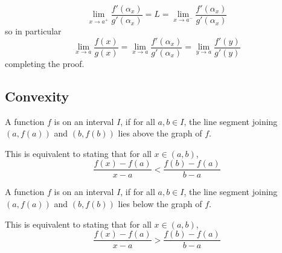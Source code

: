 \documentclass[12pt]{report}
\begin{document}
\begin{proof*}{}{}
\begin{equation*}
        \lim\limits_{x\rightarrow a^+} \frac{f'(\alpha_x)}{g'(\alpha_x)} = L = \lim\limits_{x\rightarrow a^-} \frac{f'(\alpha_x)}{g'(\alpha_x)} 
    \end{equation*}
    so in particular \begin{equation*}
        \lim\limits_{x\rightarrow a} \frac{f(x)}{g(x)} = \lim\limits_{x\rightarrow a} \frac{f'(\alpha_x)}{g'(\alpha_x)} =  \lim\limits_{y\rightarrow a} \frac{f'(y)}{g'(y)}
    \end{equation*}
    completing the proof.
\end{proof*}


\subsection{Convexity}


\begin{defn}{}{}
    A function $f$ is  on an interval $I$, if for all $a,b \in I$, the line segment joining $(a,f(a))$ and $(b,f(b))$ lies above the graph of $f$.

    This is equivalent to stating that for all $x \in (a,b)$, \begin{equation}
        \frac{f(x) - f(a)}{x-a} < \frac{f(b) - f(a)}{b-a}
    \end{equation}
\end{defn}


\begin{defn}{}{}
    A function $f$ is  on an interval $I$, if for all $a,b \in I$, the line segment joining $(a,f(a))$ and $(b,f(b))$ lies below the graph of $f$.

    This is equivalent to stating that for all $x \in (a,b)$, \begin{equation}
        \frac{f(x) - f(a)}{x-a} > \frac{f(b) - f(a)}{b-a}
    \end{equation}
\end{defn}
\end{document}
